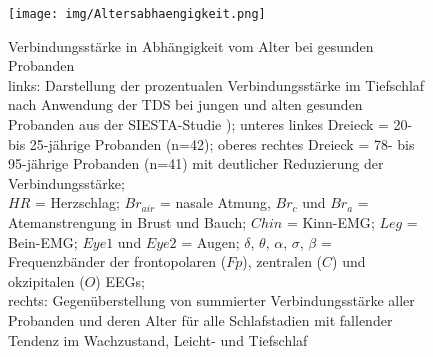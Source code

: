 \begin{figure}[H]
	\centering
	\texttt{[image: img/Altersabhaengigkeit.png]}
	\caption[Verbindungsstärke in Abhängigkeit vom Alter bei gesunden Probanden]{Verbindungsstärke in Abhängigkeit vom Alter bei gesunden Probanden\\links: Darstellung der prozentualen Verbindungsstärke im Tiefschlaf nach Anwendung der \acs{TDS} bei jungen und alten gesunden Probanden aus der SIESTA-Studie \parencite{klosch_siesta_2001}); unteres linkes Dreieck = 20- bis 25-jährige Probanden (n=42); oberes rechtes Dreieck = 78- bis 95-jährige Probanden (n=41) mit deutlicher Reduzierung der Verbindungsstärke;\\$HR$ = Herzschlag; $Br_{air}$ = nasale Atmung, $Br_c$ und $Br_a$ = Atemanstrengung in Brust und Bauch; $Chin$ = Kinn-\acs{EMG}; $Leg$ = Bein-\acs{EMG}; $Eye1$ und $Eye2$ = Augen; $\delta$, $\theta$, $\alpha$, $\sigma$, $\beta$ = Frequenzbänder der frontopolaren ($Fp$), zentralen ($C$) und okzipitalen ($O$) \acs{EEG}s;\\rechts: Gegenüberstellung von summierter Verbindungsstärke aller Probanden und deren Alter für alle Schlafstadien mit fallender Tendenz im Wachzustand, Leicht- und Tiefschlaf \parencite{krefting_age_2017}}
	\label{fig:TDSage}
\end{figure}


%
%
